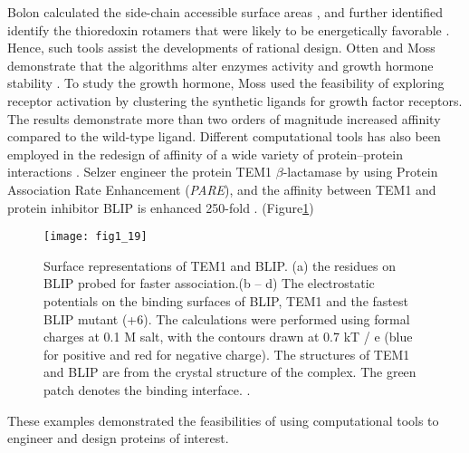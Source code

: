 \begin{refsection}
Bolon  calculated the side-chain accessible surface areas
\cite{Connolly1983}, and further identified identify the thioredoxin rotamers
that were likely to be energetically favorable \cite{Bolon2003}. Hence, such
tools assist the developments of rational design. Otten  and
Moss  demonstrate that the algorithms alter enzymes activity
\cite{Otten2010} and growth hormone stability \cite{Moss2009,Lippow2007a}. To
study the growth hormone, Moss  used  the feasibility of
exploring receptor activation by clustering the synthetic ligands for growth
factor receptors. The results demonstrate more than two orders of magnitude
increased affinity compared to the wild-type ligand. Different computational
tools has also been employed in the redesign of affinity of a wide variety of
protein–protein interactions
\cite{Selzer2000,Reina2002}.  Selzer  engineer the protein TEM1
$\beta$-lactamase by using Protein Association Rate Enhancement (\emph{PARE}),
and the affinity between TEM1 and protein inhibitor BLIP is enhanced 250-fold
\cite{Selzer2000}.
(Figure\ref{fig:tem1})
\begin{figure}[htbp] \centering \texttt{[image: fig1\_19]}
    \caption[Surface representations of TEM1 and BLIP. (a) the residues on BLIP
        probed for faster association.(b – d) The electrostatic potentials on
        the binding surfaces of BLIP, TEM1 and the fastest BLIP mutant (+6).
        The calculations were performed using formal charges at 0.1 M salt,
        with the contours drawn at 0.7 kT / e (blue for positive and red for
        negative charge). The structures of TEM1 and BLIP are from the crystal
        structure of the complex. The green patch denotes the binding
    interface.]{Surface representations of TEM1 and BLIP. (a) the residues on
        BLIP probed for faster association.(b – d) The electrostatic potentials
        on the binding surfaces of BLIP, TEM1 and the fastest BLIP mutant (+6).
        The calculations were performed using formal charges at 0.1 M salt,
        with the contours drawn at 0.7 kT / e (blue for positive and red for
        negative charge). The structures of TEM1 and BLIP are from the crystal
        structure of the complex. The green patch denotes the binding
        interface. \cite{Selzer2000}.} \label{fig:tem1} 
\end{figure}

These examples demonstrated the feasibilities of using computational tools to
engineer and design proteins of interest. 


\end{refsection}
